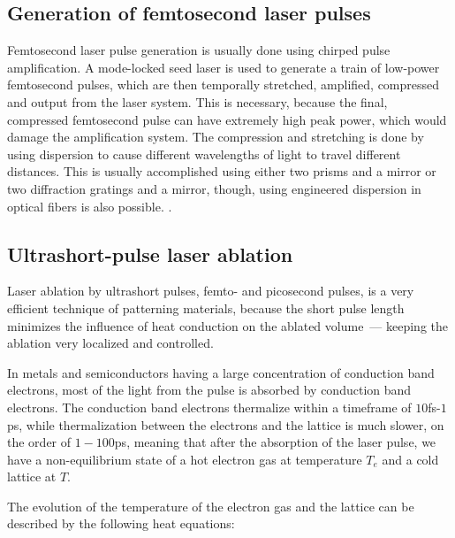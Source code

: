     \subsection{Generation of femtosecond laser pulses}
            Femtosecond laser pulse generation is usually done using chirped pulse amplification. A mode-locked seed laser is used
        to generate a train of low-power femtosecond pulses, which are then temporally stretched, amplified, compressed and output
        from the laser system. This is necessary, because the final, compressed femtosecond pulse can have extremely high peak power,
        which would damage the amplification system\cite{harilal2014femtosecond}.
            The compression and stretching is done by using dispersion to cause different wavelengths of light to travel different distances.
        This is usually accomplished using either two prisms and a mirror or two diffraction gratings and a mirror, though, using engineered
        dispersion in optical fibers is also possible\cite{harilal2014femtosecond}.
            .

    \subsection{Ultrashort-pulse laser ablation}
            Laser ablation by ultrashort pulses, femto- and picosecond pulses, is a very efficient technique of patterning materials, because
        the short pulse length minimizes the influence of heat conduction on the ablated volume~--- keeping the ablation very localized and
        controlled.

            In metals and semiconductors having a large concentration of conduction band electrons, most of the light from the pulse is
        absorbed by conduction band electrons. The conduction band electrons thermalize within a timeframe of $10$fs-$1$ps, while thermalization
        between the electrons and the lattice is much slower, on the order of $1-100$ps, meaning that after the absorption of the laser pulse,
        we have a non-equilibrium state of a hot electron gas at temperature $T_e$ and a cold lattice at $T$. \cite{bauerle2013laser}

        The evolution of the temperature of the electron gas and the lattice can be described by the following heat equations:

